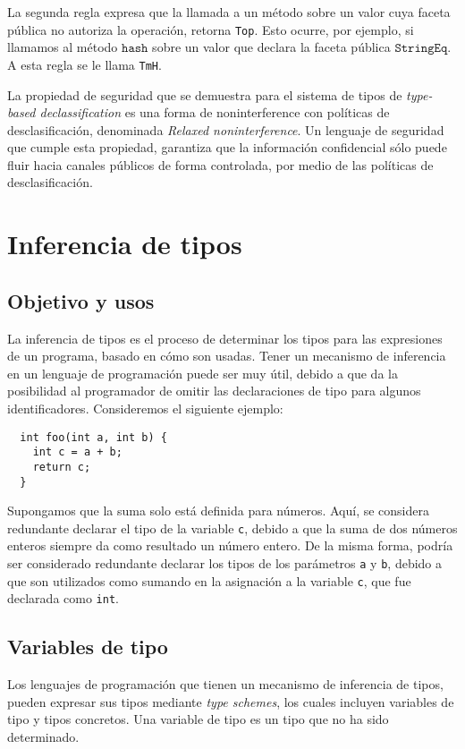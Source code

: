 La segunda regla expresa que la llamada a un método sobre un valor cuya faceta pública no autoriza la operación, retorna \texttt{Top}. Esto ocurre, por ejemplo, si llamamos al método $\mathtt{hash}$ sobre un valor que declara la faceta pública $\mathtt{StringEq}$. A esta regla se le llama \texttt{TmH}.

La propiedad de seguridad que se demuestra para el sistema de tipos de \textit{type-based declassification} es una forma de noninterference con políticas de desclasificación, denominada \textit{Relaxed noninterference}. Un lenguaje de seguridad que cumple esta propiedad, garantiza que la información confidencial sólo puede fluir hacia canales públicos de forma controlada, por medio de las políticas de desclasificación.

\section{Inferencia de tipos}
\subsection{Objetivo y usos}
La inferencia de tipos es el proceso de determinar los tipos para las expresiones de un programa, basado en cómo son usadas. Tener un mecanismo de inferencia en un lenguaje de programación puede ser muy útil, debido a que da la posibilidad al programador de omitir las declaraciones de tipo para algunos identificadores. Consideremos el siguiente ejemplo:

\begin{lstlisting}
  int foo(int a, int b) {
    int c = a + b;
    return c;
  }
\end{lstlisting}

Supongamos que la suma solo está definida para números. Aquí, se considera redundante declarar el tipo de la variable \texttt{c}, debido a que la suma de dos números enteros siempre da como resultado un número entero. De la misma forma, podría ser considerado redundante declarar los tipos de los parámetros \texttt{a} y \texttt{b}, debido a que son utilizados como sumando en la asignación a la variable \texttt{c}, que fue declarada como \texttt{int}.

\subsection{Variables de tipo} \label{schemes}
Los lenguajes de programación que tienen un mecanismo de inferencia de tipos, pueden expresar sus tipos mediante \textit{type schemes}, los cuales incluyen variables de tipo y tipos concretos. Una variable de tipo es un tipo que no ha sido determinado.

